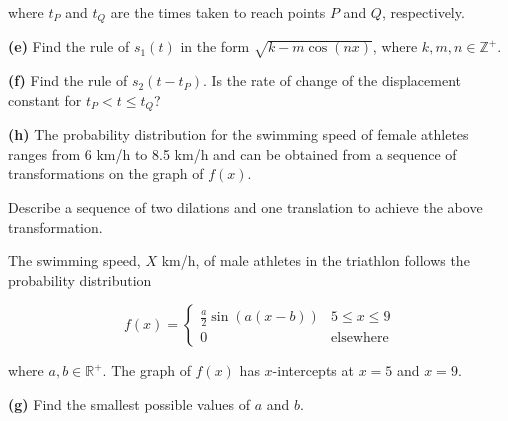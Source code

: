 \documentclass[12pt,a4paper]{article}
\begin{document}
where $t_P$ and $t_Q$ are the times taken to reach points $P$ and $Q$, respectively.

\textbf{(e)} Find the rule of $s_1(t)$ in the form $\sqrt{k - m\cos(nx)}$, where $k, m, n \in \mathbb{Z}^+$.

\textbf{(f)} Find the rule of $s_2(t - t_P)$. Is the rate of change of the displacement constant for $t_P < t \leq t_Q$?

\textbf{(h)} The probability distribution for the swimming speed of female athletes ranges from 6 km/h to 8.5 km/h and can be obtained from a sequence of transformations on the graph of $f(x)$.

Describe a sequence of two dilations and one translation to achieve the above transformation.

The swimming speed, $X$ km/h, of male athletes in the triathlon follows the probability distribution

\[
f(x) = \begin{cases}
\frac{a}{2}\sin(a(x - b)) & 5 \leq x \leq 9\\
0 & \text{elsewhere}
\end{cases}
\]

where $a, b \in \mathbb{R}^+$. The graph of $f(x)$ has $x$-intercepts at $x = 5$ and $x = 9$.

\textbf{(g)} Find the smallest possible values of $a$ and $b$.

\vspace{5\baselineskip}
\end{document}
